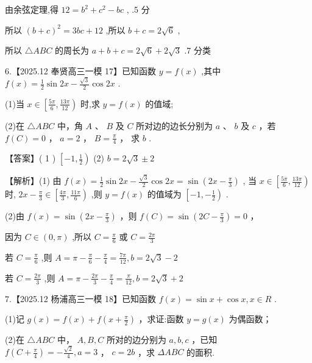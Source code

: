 \documentclass[10pt]{article}
\begin{document}
由余弦定理,得 \({12} = {b}^{2} + {c}^{2} - {bc}\) , .5 分

所以 \({\left( b + c\right) }^{2} = {3bc} + {12}\) ,所以 \(b + c = 2\sqrt{6}\) ,

所以 \(\bigtriangleup  {ABC}\) 的周长为 \(a + b + c = 2\sqrt{6} + 2\sqrt{3}\) .7 分类

6.【2025.12 奉贤高三一模 17】已知函数 \(y = f\left( x\right)\) ,其中 \(f\left( x\right)  = \frac{1}{2}\sin {2x} - \frac{\sqrt{3}}{2}\cos {2x}\) .

(1)当 \(x \in  \left\lbrack  {\frac{5\pi }{6},\frac{13\pi }{12}}\right)\) 时,求 \(y = f\left( x\right)\) 的值域;

(2)在 \(\bigtriangleup  {ABC}\) 中，角 \(A\) 、 \(B\) 及 \(C\) 所对边的边长分别为 \(a\) 、 \(b\) 及 \(c\) ，若 \(f\left( C\right)  = 0\) ， \(a = 2\) ， \(B = \frac{\pi }{4}\) ， 求 \(b\) .

【答案】( 1 ) \(\left\lbrack  {-1,\frac{1}{2}}\right)\) (2) \(b = 2\sqrt{3} \pm  2\)

【解析】(1) 由 \(f\left( x\right)  = \frac{1}{2}\sin {2x} - \frac{\sqrt{3}}{2}\cos {2x} = \sin \left( {{2x} - \frac{\pi }{3}}\right)\) , 当 \(x \in  \left\lbrack  {\frac{5\pi }{6},\frac{13\pi }{12}}\right)\) 时, \({2x} - \frac{\pi }{3} \in  \left\lbrack  {\frac{4\pi }{3},\frac{11\pi }{6}}\right)\) ,则 \(y = f\left( x\right)\) 的值域为 \(\left\lbrack  {-1, - \frac{1}{2}}\right)\) .

(2)由 \(f\left( x\right)  = \sin \left( {{2x} - \frac{\pi }{3}}\right)\) ，则 \(f\left( C\right)  = \sin \left( {{2C} - \frac{\pi }{3}}\right)  = 0\) ，

因为 \(C \in  \left( {0,\pi }\right)\) ,所以 \(C = \frac{\pi }{6}\) 或 \(C = \frac{2\pi }{3}\)

若 \(C = \frac{\pi }{6}\) ,则 \(A = \pi  - \frac{\pi }{6} - \frac{\pi }{4} = \frac{7\pi }{12},b = 2\sqrt{3} - 2\)

若 \(C = \frac{2\pi }{3}\) ,则 \(A = \pi  - \frac{2\pi }{3} - \frac{\pi }{4} = \frac{\pi }{12},b = 2\sqrt{3} + 2\)

7.【2025.12 杨浦高三一模 18】已知函数 \(f\left( x\right)  = \sin x + \cos x,x \in  R\) .

(1)记 \(g\left( x\right)  = f\left( x\right)  + f\left( {x + \frac{\pi }{2}}\right)\) ，求证:函数 \(y = g\left( x\right)\) 为偶函数；

(2)在 \(\bigtriangleup  {ABC}\) 中， \(A,B,C\) 所对的边分别为 \(a,b,c\) ，已知 \(f\left( {C + \frac{\pi }{4}}\right)  =  - \frac{\sqrt{2}}{4},a = 3\) ， \(c = {2b}\) ，求 \({\Delta ABC}\) 的面积.
\end{document}

